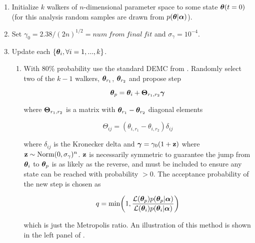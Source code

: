 \begin{enumerate}
\item Initialize $k$ walkers of $n$-dimensional parameter space to some state $\boldsymbol{\theta}(t = 0)$ (for this analysis random samples
are drawn from $p(\boldsymbol{\theta}|\boldsymbol{\alpha})$).

\item Set $\gamma_0 = 2.38 / (2 n)^{1/2} = num\ from\ final\ fit$ and $\sigma_{\gamma} = 10^{-4}$.

\item \label{itm:update_demc} Update each $\{\boldsymbol{\theta}_i, \forall i = 1, ..., k\}$.
\begin{enumerate}
\item \label{itm:update_demc_normal} With 80\% probability use the standard DEMC from .  Randomly
select two of the $k - 1$ walkers, $\boldsymbol{\theta}_{r_1}$, $\boldsymbol{\theta}_{r_2}$ and propose step

\begin{equation}
\boldsymbol{\theta}_p = \boldsymbol{\theta}_i + \boldsymbol{\Theta}_{r_1, r_2} \boldsymbol{\gamma}
\label{eq:elifetime_fit_mcmc_update_demc}
\end{equation}

\noindent where $\boldsymbol{\Theta}_{r_1, r_2}$ is a matrix with $\boldsymbol{\theta}_{r_1} - \boldsymbol{\theta}_{r_2}$ diagonal
elements

\begin{equation}
\Theta_{ij} = (\theta_{i, r_1} - \theta_{i, r_2}) \delta_{ij}
\end{equation}

\noindent where $\delta_{ij}$ is the Kronecker delta  and $\boldsymbol{\gamma} = \gamma_0 (1 + \mathbf{z})$ where
$\mathbf{z} \sim \mathrm{Norm}(0, \sigma_{\gamma})^n$.  $\mathbf{z}$ is necessarily symmetric to guarantee the jump from
$\boldsymbol{\theta}_i$ to $\boldsymbol{\theta}_p$ is as likely as the reverse, and must be included to ensure any state can be reached with
probability $> 0$.  The acceptance probability of the new step is chosen as

\begin{equation}
q = \mathrm{min} \bigg( 1, \frac{\mathcal{L}(\boldsymbol{\theta}_p) p(\boldsymbol{\theta}_p|\boldsymbol{\alpha})}
{\mathcal{L}(\boldsymbol{\theta}_i) p(\boldsymbol{\theta}_i|\boldsymbol{\alpha})} \bigg)
\label{eq:elifetime_fit_mcmc_acc_demc}
\end{equation}

\noindent which is just the Metropolis ratio.  An illustration of this method is shown in the left panel of
.


\end{enumerate}
\end{enumerate}
